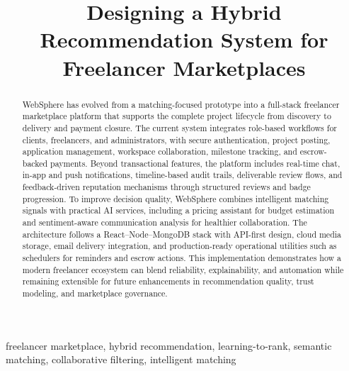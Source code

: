 \documentclass[conference]{IEEEtran}
\begin{document}
\title{Designing a Hybrid Recommendation System for Freelancer Marketplaces}

\author{%
\and
{}
}

\maketitle

\begin{abstract}
WebSphere has evolved from a matching-focused prototype into a full-stack freelancer marketplace platform that supports the complete project lifecycle from discovery to delivery and payment closure. The current system integrates role-based workflows for clients, freelancers, and administrators, with secure authentication, project posting, application management, workspace collaboration, milestone tracking, and escrow-backed payments. Beyond transactional features, the platform includes real-time chat, in-app and push notifications, timeline-based audit trails, deliverable review flows, and feedback-driven reputation mechanisms through structured reviews and badge progression. To improve decision quality, WebSphere combines intelligent matching signals with practical AI services, including a pricing assistant for budget estimation and sentiment-aware communication analysis for healthier collaboration. The architecture follows a React--Node--MongoDB stack with API-first design, cloud media storage, email delivery integration, and production-ready operational utilities such as schedulers for reminders and escrow actions. This implementation demonstrates how a modern freelancer ecosystem can blend reliability, explainability, and automation while remaining extensible for future enhancements in recommendation quality, trust modeling, and marketplace governance.
\end{abstract}

\begin{IEEEkeywords}
freelancer marketplace, hybrid recommendation, learning-to-rank, semantic matching, collaborative filtering, intelligent matching
\end{IEEEkeywords}
\end{document}
